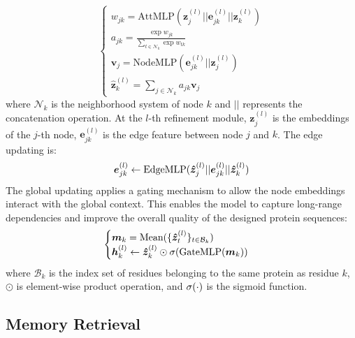 \documentclass{article}
\begin{document}
\begin{equation}
    \label{eq:attention_weight}
    \begin{cases}
        w_{jk} = \text{AttMLP}(\boldsymbol{z}_j^{(l)} || \boldsymbol{e}_{jk}^{(l)} || \boldsymbol{z}_k^{(l)})\\
        a_{jk} = \frac{\exp{w_{jk}}}{\sum_{t \in \mathcal{N}_k}{\exp{w_{tk}}}}\\
        \boldsymbol{v}_j = \text{NodeMLP}(\boldsymbol{e}_{jk}^{(l)} || \boldsymbol{z}_j^{(l)})\\
        \boldsymbol{\hat{z}}_k^{(l)} = \sum_{j \in \mathcal{N}_k}{a_{jk} \boldsymbol{v}_j} 
    \end{cases}
\end{equation}
where $\mathcal{N}_k$ is the neighborhood system of node $k$ and $||$ represents the concatenation operation. At the $l$-th refinement module, $\boldsymbol{z}_j^{(l)}$ is the embeddings of the $j$-th node, $\boldsymbol{e}_{jk}^{(l)}$ is the edge feature between node $j$ and $k$. The edge updating is:
\begin{equation}
   \label{eq:edge}
      \boldsymbol{e}_{jk}^{(l)} \leftarrow \text{EdgeMLP}(\boldsymbol{\hat{z}}_j^{(l)} || \boldsymbol{e}_{jk}^{(l)} || \boldsymbol{\hat{z}}_k^{(l)}) \\
\end{equation}
The global updating applies a gating mechanism to allow the node embeddings interact with the global context. This enables the model to capture long-range dependencies and improve the overall quality of the designed protein sequences:
\begin{equation}
   \label{eq:global}
   \begin{cases}
       \boldsymbol{m}_k = \text{Mean}(\{ \boldsymbol{\hat{z}}_t^{(l)} \}_{t \in \mathcal{B}_k})\\
       \boldsymbol{h}_k^{(l)} \leftarrow \boldsymbol{\hat{z}}_k^{(l)} \odot \sigma( \text{GateMLP} (\boldsymbol{m}_k)) \\
   \end{cases}
\end{equation}
where $\mathcal {B}_k$ is the index set of residues belonging to the same protein as residue $k$, $\odot$ is element-wise product operation, and $\sigma(\cdot)$ is the sigmoid function. 




\subsection{Memory Retrieval}
\vspace{-3mm}
\end{document}
